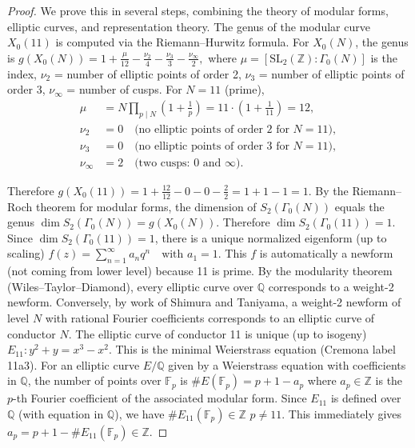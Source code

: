 \documentclass[10pt,a4paper]{amsart}
\newcommand{\Q}{\mathbb{Q}}
\newcommand{\Z}{\mathbb{Z}}
\begin{document}
\begin{proof}
We prove this in several steps, combining the theory of modular forms, elliptic curves, and representation theory. The genus of the modular curve $X_0(11)$ is computed via the Riemann--Hurwitz formula. For $X_0(N)$, the genus is $g(X_0(N)) = 1 + \frac{\mu}{12} - \frac{\nu_2}{4} - \frac{\nu_3}{3} - \frac{\nu_\infty}{2},$ where 
$\mu = [\mathrm{SL}_2(\Z) : \Gamma_0(N)]$ is the index, $\nu_2$ = number of elliptic points of order 2, $\nu_3$ = number of elliptic points of order 3, $\nu_\infty$ = number of cusps. For $N = 11$ (prime),
\begin{align*}
\mu &= N \prod_{p \mid N} \left(1 + \frac{1}{p}\right) = 11 \cdot \left(1 + \frac{1}{11}\right) = 12, \\
\nu_2 &= 0 \quad \text{(no elliptic points of order 2 for } N = 11), \\
\nu_3 &= 0 \quad \text{(no elliptic points of order 3 for } N = 11), \\
\nu_\infty &= 2 \quad \text{(two cusps: } 0 \text{ and } \infty).
\end{align*}

Therefore $g(X_0(11)) = 1 + \frac{12}{12} - 0 - 0 - \frac{2}{2} = 1 + 1 - 1 = 1$. By the Riemann--Roch theorem for modular forms, the dimension of $S_2(\Gamma_0(N))$ equals the genus $\dim S_2(\Gamma_0(N)) = g(X_0(N))$. Therefore $\dim S_2(\Gamma_0(11)) = 1$. Since $\dim S_2(\Gamma_0(11)) = 1$, there is a unique normalized eigenform (up to scaling)
$f(z) = \sum_{n=1}^{\infty} a_n q^n \quad \text{with } a_1 = 1$. This $f$ is automatically a newform (not coming from lower level) because 11 is prime. By the modularity theorem (Wiles--Taylor--Diamond), every elliptic curve over $\Q$ corresponds to a weight-2 newform. Conversely, by work of Shimura and Taniyama, a weight-2 newform of level $N$ with rational Fourier coefficients corresponds to an elliptic curve of conductor $N$. The elliptic curve of conductor 11 is unique (up to isogeny) $E_{11}: y^2 + y = x^3 - x^2.$ This is the minimal Weierstrass equation (Cremona label 11a3). For an elliptic curve $E/\Q$ given by a Weierstrass equation with coefficients in $\Q$, the number of points over $\mathbb{F}_p$ is $\#E(\mathbb{F}_p) = p + 1 - a_p$ where $a_p \in \Z$ is the $p$-th Fourier coefficient of the associated modular form. Since $E_{11}$ is defined over $\Q$ (with equation in $\Q$), we have $\#E_{11}(\mathbb{F}_p) \in \Z$  $p \neq 11$.  This immediately gives $a_p = p + 1 - \#E_{11}(\mathbb{F}_p) \in \Z$.


\end{proof}
\end{document}
